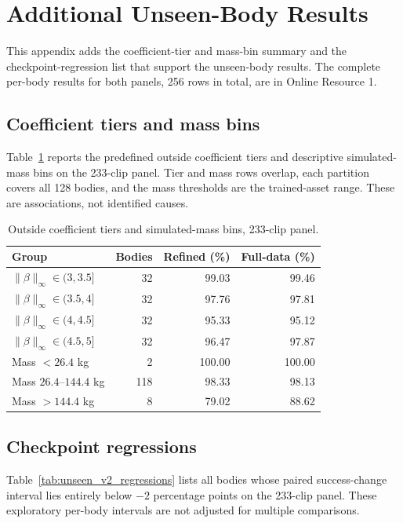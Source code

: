\section{Additional Unseen-Body Results}\label{app:unseen_tables}
This appendix adds the coefficient-tier and mass-bin summary and the
checkpoint-regression list that support the unseen-body results. The complete
per-body results for both panels, 256 rows in total, are in Online Resource 1.

\subsection{Coefficient tiers and mass bins}
Table~\ref{tab:unseen_v2_groups} reports the predefined outside coefficient
tiers and descriptive simulated-mass bins on the 233-clip panel. Tier and mass
rows overlap, each partition covers all 128 bodies, and the mass thresholds are
the trained-asset range. These are associations, not identified causes.

\begin{table}[t]
\centering\small
\caption{Outside coefficient tiers and simulated-mass bins, 233-clip panel.}\label{tab:unseen_v2_groups}
\begin{tabular}{lrrr}
\toprule
Group & Bodies & Refined (\%) & Full-data (\%) \\
\midrule
$\|\beta\|_\infty\in(3,3.5]$ & 32 & 99.03 & 99.46 \\
$\|\beta\|_\infty\in(3.5,4]$ & 32 & 97.76 & 97.81 \\
$\|\beta\|_\infty\in(4,4.5]$ & 32 & 95.33 & 95.12 \\
$\|\beta\|_\infty\in(4.5,5]$ & 32 & 96.47 & 97.87 \\
\midrule
Mass $<26.4$ kg & 2 & 100.00 & 100.00 \\
Mass $26.4$--$144.4$ kg & 118 & 98.33 & 98.13 \\
Mass $>144.4$ kg & 8 & 79.02 & 88.62 \\
\bottomrule
\end{tabular}
\end{table}

\subsection{Checkpoint regressions}
Table~\ref{tab:unseen_v2_regressions} lists all bodies whose paired
success-change interval lies entirely below $-2$ percentage points on the
233-clip panel. These exploratory per-body intervals are not adjusted for
multiple comparisons.

